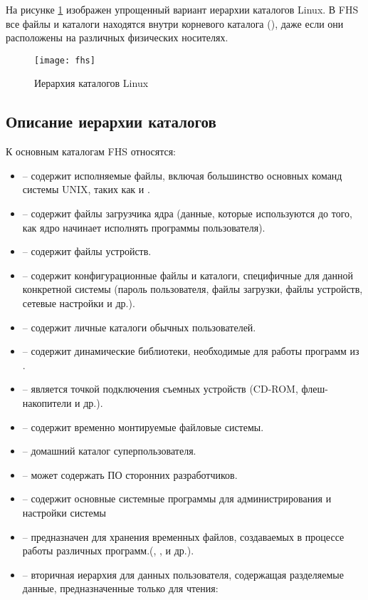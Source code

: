 На рисунке \ref{fig:fhs} изображен упрощенный вариант иерархии каталогов Linux. В FHS все файлы и каталоги находятся внутри корневого каталога (\code{/}), даже если они расположены на различных физических носителях. 
\begin{figure}[H]
	\centering
	\texttt{[image: fhs]}
	\caption{Иерархия каталогов Linux}
	\label{fig:fhs}
\end{figure}

\subsection{Описание иерархии каталогов}

К основным каталогам FHS относятся:
\begin{itemize}
	\item {} -- содержит исполняемые файлы, включая большинство основных команд системы UNIX, таких как  и .
	\item {} -- содержит файлы загрузчика ядра (данные, которые используются до того, как ядро начинает исполнять программы пользователя).
	\item {} -- содержит файлы устройств.
	\item {} -- содержит конфигурационные файлы и каталоги, специфичные для данной конкретной системы (пароль
	пользователя, файлы загрузки, файлы устройств, сетевые настройки и др.).
	\item {} -- содержит личные каталоги обычных пользователей.
	\item {} -- содержит динамические библиотеки, необходимые для работы программ из .
	\item {} -- является точкой подключения съемных устройств (CD-ROM, флеш-накопители и др.).
	\item {} -- содержит временно монтируемые файловые системы.
	\item {} -- домашний каталог суперпользователя.
	\item {} -- может содержать ПО сторонних разработчиков.
	\item {} -- содержит основные системные программы для администрирования и настройки системы 
	\item {} -- предназначен для хранения временных файлов, создаваемых в процессе работы различных программ.(, ,  и др.).
	\item {} -- вторичная иерархия для данных пользователя,  содержащая разделяемые данные, предназначенные только для чтения:

\end{itemize}
